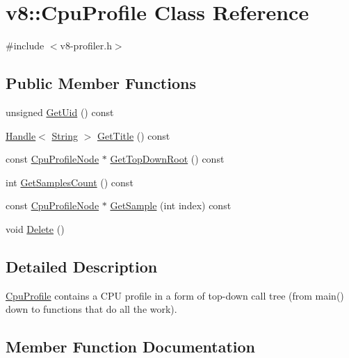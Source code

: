 \hypertarget{classv8_1_1_cpu_profile}{}\section{v8\+:\+:Cpu\+Profile Class Reference}
\label{classv8_1_1_cpu_profile}


{\ttfamily \#include $<$v8-\/profiler.\+h$>$}

\subsection*{Public Member Functions}
\begin{DoxyCompactItemize}
\item 
unsigned \hyperlink{classv8_1_1_cpu_profile_a382bbf10d24a2cd8b17acb8508c56a58}{Get\+Uid} () const 
\item 
\hyperlink{classv8_1_1_handle}{Handle}$<$ \hyperlink{classv8_1_1_string}{String} $>$ \hyperlink{classv8_1_1_cpu_profile_afbb44d5cf0a8729c9074aba03207e5cc}{Get\+Title} () const 
\item 
const \hyperlink{classv8_1_1_cpu_profile_node}{Cpu\+Profile\+Node} $\ast$ \hyperlink{classv8_1_1_cpu_profile_aec978f073af6634b6495baa65209a31f}{Get\+Top\+Down\+Root} () const 
\item 
int \hyperlink{classv8_1_1_cpu_profile_a2ca9d8e862dc2b06892196b5e5a14994}{Get\+Samples\+Count} () const 
\item 
const \hyperlink{classv8_1_1_cpu_profile_node}{Cpu\+Profile\+Node} $\ast$ \hyperlink{classv8_1_1_cpu_profile_a59470cd1286e949dd069eea87777a074}{Get\+Sample} (int index) const 
\item 
void \hyperlink{classv8_1_1_cpu_profile_a70c93f0c14d07a7e1bad42ee95665ca0}{Delete} ()
\end{DoxyCompactItemize}


\subsection{Detailed Description}
\hyperlink{classv8_1_1_cpu_profile}{Cpu\+Profile} contains a C\+P\+U profile in a form of top-\/down call tree (from main() down to functions that do all the work). 

\subsection{Member Function Documentation}
\hypertarget{classv8_1_1_cpu_profile_a70c93f0c14d07a7e1bad42ee95665ca0}{}
